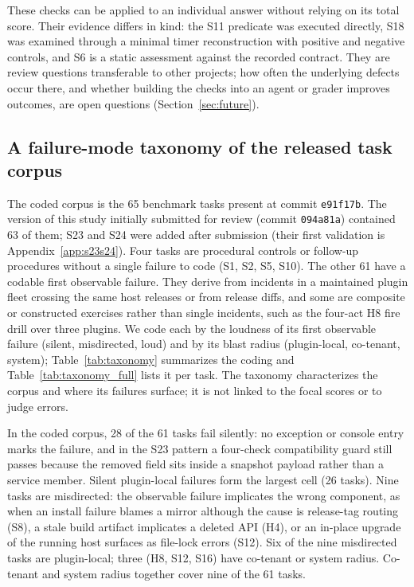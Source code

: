 \documentclass[11pt]{article}
\begin{document}
These checks can be applied to an individual answer without relying on its total score. Their evidence differs in kind: the S11 predicate was executed directly, S18 was examined through a minimal timer reconstruction with positive and negative controls, and S6 is a static assessment against the recorded contract. They are review questions transferable to other projects; how often the underlying defects occur there, and whether building the checks into an agent or grader improves outcomes, are open questions (Section~\ref{sec:future}).

\subsection{A failure-mode taxonomy of the released task corpus}
\label{sec:taxonomy}

The coded corpus is the 65 benchmark tasks present at commit \texttt{e91f17b}. The version of this study initially submitted for review (commit \texttt{094a81a}) contained 63 of them; S23 and S24 were added after submission (their first validation is Appendix~\ref{app:s23s24}). Four tasks are procedural controls or follow-up procedures without a single failure to code (S1, S2, S5, S10). The other 61 have a codable first observable failure. They derive from incidents in a maintained plugin fleet crossing the same host releases or from release diffs, and some are composite or constructed exercises rather than single incidents, such as the four-act H8 fire drill over three plugins. We code each by the loudness of its first observable failure (silent, misdirected, loud) and by its blast radius (plugin-local, co-tenant, system); Table~\ref{tab:taxonomy} summarizes the coding and Table~\ref{tab:taxonomy_full} lists it per task. The taxonomy characterizes the corpus and where its failures surface; it is not linked to the focal scores or to judge errors.

In the coded corpus, 28 of the 61 tasks fail silently: no exception or console entry marks the failure, and in the S23 pattern a four-check compatibility guard still passes because the removed field sits inside a snapshot payload rather than a service member. Silent plugin-local failures form the largest cell (26 tasks). Nine tasks are misdirected: the observable failure implicates the wrong component, as when an install failure blames a mirror although the cause is release-tag routing (S8), a stale build artifact implicates a deleted API (H4), or an in-place upgrade of the running host surfaces as file-lock errors (S12). Six of the nine misdirected tasks are plugin-local; three (H8, S12, S16) have co-tenant or system radius. Co-tenant and system radius together cover nine of the 61 tasks.
\end{document}
